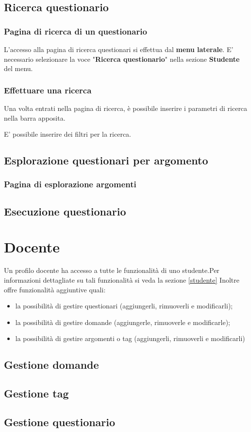 \documentclass[12pt,a4paper]{article}
\begin{document}
	\subsection{Ricerca questionario}
	\subsubsection{Pagina di ricerca  di un questionario}
	L'accesso alla pagina di ricerca questionari si effettua dal \textbf{menu laterale}. 
	E' necessario selezionare la voce "\textbf{Ricerca questionario}" nella sezione \textbf{Studente} del menu.
	\subsubsection{Effettuare una ricerca}
	Una volta entrati nella pagina di ricerca, è possibile inserire i parametri di ricerca nella barra apposita.
	\begin{comment}
	inserire immagine barra di ricerca
	\end{comment}
	
	E' possibile inserire dei filtri per la ricerca. 
	\begin{comment} inserire immagine e altre informazioni per la ricerca con filtri	\end{comment}
	\subsection{Esplorazione questionari per argomento}
	\subsubsection{Pagina di esplorazione argomenti}
	\subsection{Esecuzione questionario}
	\section{Docente}\label{docente}
	Un profilo docente ha accesso a tutte le funzionalità di uno studente.Per informazioni dettagliate su tali funzionalità si veda la sezione \ref{studente}
		Inoltre offre funzionalità aggiuntive quali:
		\begin{itemize}
			\item la possibilità di gestire questionari (aggiungerli, rimuoverli e modificarli);
			\item la possibilità di gestire domande (aggiungerle, rimuoverle e modificarle);
			\item la possibilità di gestire argomenti o tag (aggiungerli, rimuoverli e modificarli)
		\end{itemize}
    \subsection{Gestione domande}
	\subsection{Gestione tag}
	\subsection{Gestione questionario}
	

	
	
	


	
\end{document}
